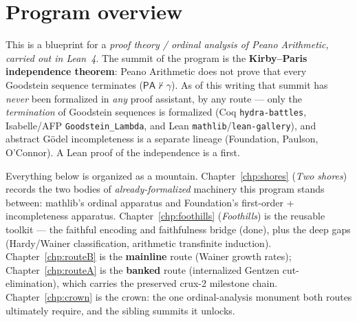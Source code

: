 %
%

\chapter{Program overview}

This is a blueprint for a \emph{proof theory / ordinal analysis of Peano Arithmetic, carried out in
Lean~4}.  The summit of the program is the \textbf{Kirby--Paris independence theorem}: Peano
Arithmetic does not prove that every Goodstein sequence terminates
(\(\mathsf{PA} \nvdash \gamma\)).  As of this writing that summit has \emph{never} been formalized in
\emph{any} proof assistant, by any route --- only the \emph{termination} of Goodstein sequences is
formalized (Coq \texttt{hydra-battles}, Isabelle/AFP \texttt{Goodstein\_Lambda}, and Lean
\texttt{mathlib}/\texttt{lean-gallery}), and abstract Gödel incompleteness is a separate lineage
(Foundation, Paulson, O'Connor).  A Lean proof of the independence is a first.

Everything below is organized as a mountain.  Chapter~\ref{chp:shores} (\emph{Two shores}) records
the two bodies of \emph{already-formalized} machinery this program stands between: mathlib's ordinal
apparatus and Foundation's first-order + incompleteness apparatus.  Chapter~\ref{chp:foothills}
(\emph{Foothills}) is the reusable toolkit --- the faithful encoding and faithfulness bridge (done),
plus the deep gaps (Hardy/Wainer classification, arithmetic transfinite induction).
Chapter~\ref{chp:routeB} is the \textbf{mainline} route (Wainer growth rates); Chapter~\ref{chp:routeA}
is the \textbf{banked} route (internalized Gentzen cut-elimination), which carries the preserved
crux-2 milestone chain.  Chapter~\ref{chp:crown} is the crown: the one ordinal-analysis monument both
routes ultimately require, and the sibling summits it unlocks.

